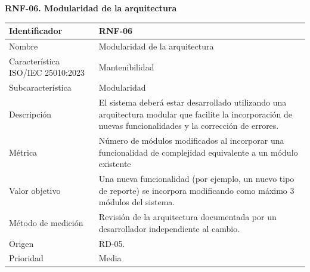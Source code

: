 \documentclass[12pt,a4paper]{article}
\begin{document}
\begin{minipage}{\linewidth}
\bigskip
\noindent\textbf{RNF-06. Modularidad de la arquitectura}
\label{tab:RNF-06}

\begin{center}
\begin{tabular}{|p{4.2cm}|p{10cm}|}
\hline
Identificador & RNF-06 \\
\hline
Nombre & Modularidad de la arquitectura \\
\hline
Característica ISO/IEC 25010:2023 & Mantenibilidad \\
\hline
Subcaracterística & Modularidad \\
\hline
Descripción & El sistema deberá estar desarrollado utilizando una arquitectura modular que facilite la incorporación de nuevas funcionalidades y la corrección de errores. \\
\hline
Métrica & Número de módulos modificados al incorporar una funcionalidad de complejidad equivalente a un módulo existente \\
\hline
Valor objetivo & Una nueva funcionalidad (por ejemplo, un nuevo tipo de reporte) se incorpora modificando como máximo 3 módulos del sistema. \\
\hline
Método de medición & Revisión de la arquitectura documentada por un desarrollador independiente al cambio. \\
\hline
Origen & RD-05. \\
\hline
Prioridad & Media \\
\hline
\end{tabular}
\end{center}
\end{minipage}
\end{document}
